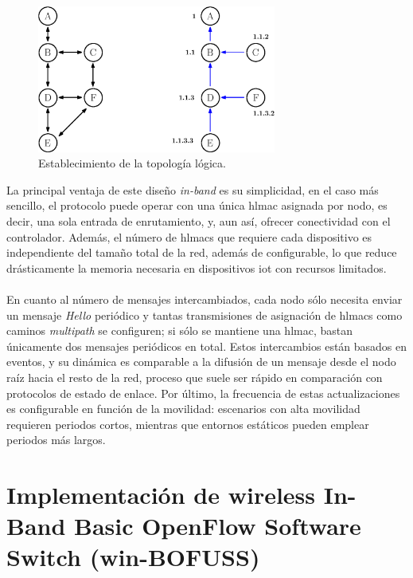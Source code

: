 \begin{figure}[ht!]
     \centering
     \includegraphics[width=0.7\textwidth]{fig/04_in-band/in_band_4.eps}
     \caption{Establecimiento de la topología lógica.}
     \label{fig:in_band_4}
\end{figure}


La principal ventaja de este diseño \textit{in-band} es su simplicidad, en el caso más sencillo, el protocolo puede operar con una única \gls{hlmac} asignada por nodo, es decir,  una sola entrada de enrutamiento, y, aun así, ofrecer conectividad con el controlador. Además, el número de \glspl{hlmac} que requiere cada dispositivo es independiente del tamaño total de la red, además de configurable, lo que reduce drásticamente la memoria necesaria en dispositivos \gls{iot} con recursos limitados. \\
\\
En cuanto al número de mensajes intercambiados, cada nodo sólo necesita enviar un mensaje \textit{Hello} periódico y tantas transmisiones de asignación de \glspl{hlmac} como caminos \textit{multipath} se configuren; si sólo se mantiene una \gls{hlmac}, bastan únicamente dos mensajes periódicos en total. Estos intercambios están basados en eventos, y su dinámica es comparable a la difusión de un mensaje desde el nodo raíz hacia el resto de la red, proceso que suele ser rápido en comparación con protocolos de estado de enlace. Por último, la frecuencia de estas actualizaciones es configurable en función de la movilidad: escenarios con alta movilidad requieren periodos cortos, mientras que entornos estáticos pueden emplear periodos más largos.

\section{Implementación de wireless In-Band Basic OpenFlow Software Switch (win-BOFUSS)}

